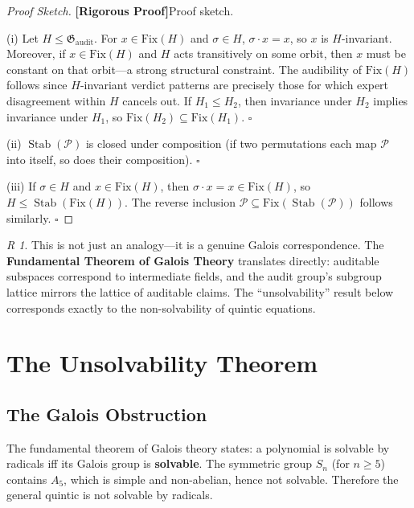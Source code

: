 \documentclass[12pt,a4paper]{article}
\theoremstyle{remark}
\newtheorem{remark}[theorem]Remark
\newcommand{\Fix}{\mathrm{Fix}}
\newcommand{\AuditGrp}{\mathfrak{G}_{\mathrm{audit}}}
\DeclareMathOperator{\Stab}{Stab}
\newcommand{\rigorous}{\textnormal{\textbf{[Rigorous Proof]}}}
\begin{document}
\begin{proof}[Proof Sketch]
\rigorous Proof sketch.

(i) Let \(H \leq \AuditGrp\). For \(x \in \Fix(H)\) and \(\sigma \in H\), \(\sigma \cdot x = x\), so \(x\) is \(H\)-invariant. Moreover, if \(x \in \Fix(H)\) and \(H\) acts transitively on some orbit, then \(x\) must be constant on that orbit---a strong structural constraint. The audibility of \(\Fix(H)\) follows since \(H\)-invariant verdict patterns are precisely those for which expert disagreement within \(H\) cancels out. If \(H_1 \leq H_2\), then invariance under \(H_2\) implies invariance under \(H_1\), so \(\Fix(H_2) \subseteq \Fix(H_1)\). \(\square\)

(ii) \(\Stab(\mathcal{P})\) is closed under composition (if two permutations each map \(\mathcal{P}\) into itself, so does their composition). \(\square\)

(iii) If \(\sigma \in H\) and \(x \in \Fix(H)\), then \(\sigma \cdot x = x \in \Fix(H)\), so \(H \leq \Stab(\Fix(H))\). The reverse inclusion \(\mathcal{P} \subseteq \Fix(\Stab(\mathcal{P}))\) follows similarly. \(\square\)
\end{proof}
\begin{remark}
This is not just an analogy---it is a genuine Galois correspondence. The \textbf{Fundamental Theorem of Galois Theory} translates directly: auditable subspaces correspond to intermediate fields, and the audit group's subgroup lattice mirrors the lattice of auditable claims. The ``unsolvability'' result below corresponds exactly to the non-solvability of quintic equations.
\end{remark}
\section{The Unsolvability Theorem}\label{sec:unsolvability}
\subsection{The Galois Obstruction}
The fundamental theorem of Galois theory states: a polynomial is solvable by radicals iff its Galois group is \textbf{solvable}. The symmetric group \(S_n\) (for \(n \geq 5\)) contains \(A_5\), which is simple and non-abelian, hence not solvable. Therefore the general quintic is not solvable by radicals.
\end{document}
